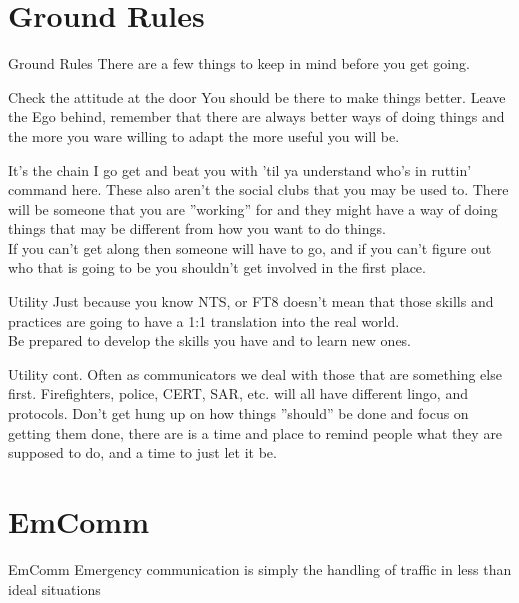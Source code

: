 \documentclass[11pt]{beamer}
\begin{document}
\section{Ground Rules}

\begin{frame}{Ground Rules}
There are a few things to keep in mind before you get going.
\end{frame}

\begin{frame}{Check the attitude at the door}
You should be there to make things better. Leave the Ego behind, remember that there are always better ways of doing things and the more you ware willing to adapt the more useful you will be.
\end{frame}

\begin{frame}{It's the chain I go get and beat you with 'til ya understand who's in ruttin' command here.}
These also aren't the social clubs that you may be used to. There will be someone that you are ''working'' for and they might have a way of doing things that may be different from how you want to do things. \\
If you can't get along then someone will have to go, and if you can't figure out who that is going to be you shouldn't get involved in the first place.
\end{frame}

\begin{frame}{Utility}
Just because you know NTS, or FT8 doesn't mean that those skills and practices are going to have a 1:1 translation into the real world. \\
Be prepared to develop the skills you have and to learn new ones.
\end{frame}

\begin{frame}{Utility cont.}
Often as communicators we deal with those that are something else first. Firefighters, police, CERT, SAR, etc. will all have different lingo, and protocols. Don't get hung up on how things ''should'' be done and focus on getting them done, there are is a time and place to remind people what they are supposed to do, and a time to just let it be. 
\end{frame}

\section{EmComm}

\begin{frame}{EmComm}
Emergency communication is simply the handling of traffic in less than ideal situations
\end{frame}
\end{document}
